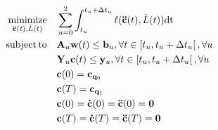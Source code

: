 \begin{equation} \label{eq:qp_rob} \begin{aligned}
\minimize_{\mathbf{\ddot{c}}(t), \dot{L}(t)}  \quad & \sum_{u=0}^{2} \int_{t_u}^{t_u + \Delta t_u}  \ell(\mathbf{\ddot{c}}(t), \dot{L}(t)) \text{dt}  \\
\st \quad & \mathbf{A}_u \mathbf{w}(t)  \leq \mathbf{b}_u , \forall t \in  \left[t_u, t_u + \Delta t_u \right[, \forall u \\
	\quad & \mathbf{Y}_u \mathbf{c}(t)  \leq \mathbf{y}_u , \forall t \in  \left[t_u, t_u + \Delta t_u \right[, \forall u \\
	\quad & \mathbf{c}(0)  = \mathbf{c}_{\mathbf{q}_0} \\
	\quad & \mathbf{c}(T)  = \mathbf{c}_{\mathbf{q}_1} \\
	\quad & \mathbf{c}(0)  = \mathbf{\dot{c}}(0)  = \mathbf{\ddot{c}}(0) = \mathbf{0}\\
	\quad & \mathbf{c}(T)  = \mathbf{\dot{c}}(T)  = \mathbf{\ddot{c}}(T) = \mathbf{0}\\
\end{aligned} \end{equation}
